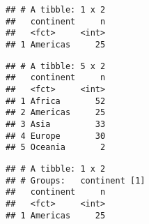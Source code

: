 \documentclass[
]{book}
\newenvironment{Shaded}{\begin{snugshade}}{\end{snugshade}}
\newcommand{\CommentTok}[1]{\textcolor[rgb]{0.56,0.35,0.01}{\textit{#1}}}
\newcommand{\DecValTok}[1]{\textcolor[rgb]{0.00,0.00,0.81}{#1}}
\newcommand{\KeywordTok}[1]{\textcolor[rgb]{0.13,0.29,0.53}{\textbf{#1}}}
\newcommand{\NormalTok}[1]{#1}
\newcommand{\OperatorTok}[1]{\textcolor[rgb]{0.81,0.36,0.00}{\textbf{#1}}}
\newcommand{\StringTok}[1]{\textcolor[rgb]{0.31,0.60,0.02}{#1}}
\begin{document}
\begin{verbatim}
## # A tibble: 1 x 2
##   continent     n
##   <fct>     <int>
## 1 Americas     25
\end{verbatim}

\begin{Shaded}
\end{Shaded}

\begin{verbatim}
## # A tibble: 5 x 2
##   continent     n
##   <fct>     <int>
## 1 Africa       52
## 2 Americas     25
## 3 Asia         33
## 4 Europe       30
## 5 Oceania       2
\end{verbatim}

\begin{Shaded}
\end{Shaded}

\begin{verbatim}
## # A tibble: 1 x 2
## # Groups:   continent [1]
##   continent     n
##   <fct>     <int>
## 1 Americas     25
\end{verbatim}

\begin{Shaded}
\end{Shaded}
\end{document}
